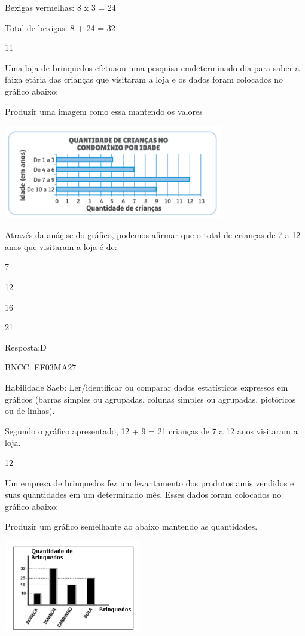 \begin{escolha}
\begin{escolha}
Bexigas vermelhas: 8 x 3 = 24

Total de bexigas: 8 + 24 = 32

\num{11}

Uma loja de brinquedos efetuaou uma pesquisa emdeterminado dia para
saber a faixa etária das crianças que visitaram a loja e os dados foram
colocados no gráfico abaixo:

Produzir uma imagem como essa mantendo os valores

\includegraphics[width=3.77564in,height=1.60972in]{media/image136.png}

Através da anáçise do gráfico, podemos afirmar que o total de crianças
de 7 a 12 anos que visitaram a loja é de:

\begin{escolha}

\item
  7
\item
  12
\item
  16
\item
  21
\end{escolha}

Resposta:D

BNCC: EF03MA27

Habilidade Saeb: Ler/identificar ou comparar dados estatísticos
expressos em gráficos (barras simples ou agrupadas, colunas simples ou
agrupadas, pictóricos ou de linhas).

Segundo o gráfico apresentado, 12 + 9 = 21 crianças de 7 a 12 anos
visitaram a loja.

\num{12}

Um empresa de brinquedos fez um levantamento dos produtos amis vendidos
e suas quantidades em um determinado mês. Esses dados foram colocados no
gráfico abaixo:

Produzir um gráfico semelhante ao abaixo mantendo as quantidades.

\includegraphics[width=2.35294in,height=1.56863in]{media/image137.png}


\end{escolha}
\end{escolha}
